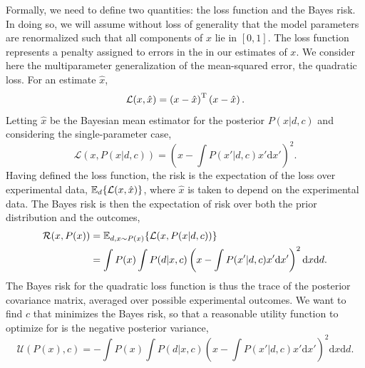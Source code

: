 \documentclass[aps,amsmath,onecolumn,amssymb]{revtex4}
\begin{document}
Formally, we need to define two quantities: the loss function and the Bayes
risk. In doing so, we will assume without loss of generality that the model
parameters are renormalized such that all components of $x$ lie in $[0, 1]$.
The loss function represents a penalty assigned to errors in the in our
estimates of $x$. We consider here the multiparameter generalization of the
mean-squared error, the quadratic loss. For an estimate $\hat{x}$,
\begin{equation}
    \mathcal{L}(x, \hat{x}) = \left(x - \hat{x}\right)^\TT \left(x - \hat{x}\right).
\end{equation}
Letting $\hat{x}$ be the Bayesian mean estimator for the posterior $P(x | d, c)$
and considering the single-parameter case,
\begin{equation}
    \mathcal{L}(x, P(x|d,c)) = \left(x-\int P(x'|d,c) x' \mathrm{d}x'\right)^2.
\end{equation}
Having defined the loss function, the risk is the expectation of the loss over
experimental data, $\expect{\mathcal{L}(x, \hat{x})}{d}$, where $\hat{x}$ is
taken to depend on the experimental data. The Bayes risk is then the
expectation of risk over both the prior distribution and the outcomes,
\begin{gather}
    \begin{aligned}
        \mathcal{R}(x, P(x)) & = \expect{\mathcal{L}(x, P(x | d, c))}{d, x \sim P(x)} \\
                             & = \int P(x)\int P(d|x,c) \left(x-\int P(x'|d,c) x' \mathrm{d}x'\right)^2 \mathrm{d}x\mathrm{d}d.
    \end{aligned}
\end{gather}
The Bayes risk for the quadratic loss function is thus the trace of the posterior covariance matrix,
averaged over possible experimental outcomes.
We want to find $c$ that minimizes the Bayes risk, so that a reasonable utility function to optimize for is the negative posterior variance,
\begin{equation}
    \label{eq:utility}
    \mathcal{U}(P(x),c) = -\int P(x)\int P(d|x,c) \left(x-\int P(x'|d,c) x' \mathrm{d}x'\right)^2 \mathrm{d}x\mathrm{d}d.
\end{equation}
\end{document}
